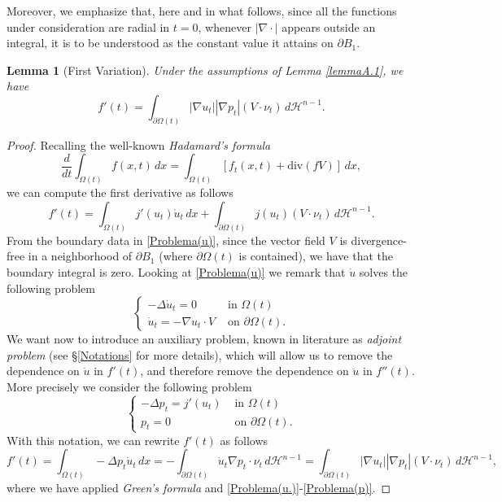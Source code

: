 \documentclass[oneside,a4paper,11pt,notitlepage]{article}
\newcommand{\abs}[1]{{\left|#1\right|}}
\theoremstyle{definition}
\theoremstyle{plain}
\newtheorem{lemma}[theorem]{Lemma}
\theoremstyle{definition}
\begin{document}
Moreover, we emphasize that, here and in what follows, since all the functions under consideration are radial in $t=0$, whenever $\abs{\nabla\cdot}$ appears outside an integral, it is to be understood as the constant value it attains on $\partial B_1$.
\begin{lemma}[First Variation]
    Under the assumptions of Lemma \ref{lemmaA.1}, we have
    \begin{equation*}
        f'(t)=\int_{\partial\Omega(t)}\abs{\nabla u_t}\abs{\nabla p_t}(V\cdot\nu_t)\,d\mathcal{H}^{n-1}.
    \end{equation*}
\end{lemma}
\begin{proof}
    Recalling the well-known \emph{Hadamard's formula}
\begin{equation*}
    \frac{d}{dt}\int_{\Omega(t)}f(x,t)\,dx=\int_{\Omega(t)} [f_t(x,t)+\mathrm{div}(fV)]\,dx,
\end{equation*}
we can compute the first derivative as follows
\begin{equation*}
    f'(t)=\int_{\Omega(t)}j'(u_t)\dot{u}_t\,dx+\int_{\partial\Omega(t)}j(u_t)(V\cdot \nu_t)\,d\mathcal{H}^{n-1}.
\end{equation*}
From the boundary data in \eqref{Problema(u)}, since the vector field $V$ is divergence-free in a neighborhood of $\partial B_1$ (where $\partial\Omega(t)$ is contained), we have that the boundary integral is zero. Looking at \eqref{Problema(u)} we remark that $\dot{u}$ solves the following problem
\begin{equation}\label{Problema(u.)}
    \begin{cases}
        -\Delta \dot{u}_t=0 & \text{ in }\Omega(t)\\
        \dot{u}_t=-\nabla u_t\cdot V & \text{ on } \partial\Omega(t).
    \end{cases}
\end{equation}
We want now to introduce an auxiliary problem, known in literature as \emph{adjoint problem} (see \S\ref{Notations} for more details), which will allow us to remove the dependence on $\dot{u}$ in $f'(t)$, and therefore remove the dependence on $\ddot{u}$ in $f''(t)$. More precisely we consider the following problem
\begin{equation}\label{Problema(p)}
    \begin{cases}
        -\Delta p_t= j'(u_t) & \text{ in }\Omega(t)\\
        p_t=0 & \text{ on } \partial\Omega(t).
    \end{cases}
\end{equation}
With this notation, we can rewrite $f'(t)$ as follows
\begin{equation*}
    f'(t)=\int_{\Omega(t)}-\Delta p_t \dot{u}_t\,dx=-\int_{\partial \Omega(t)}\dot{u}_t\nabla p_t\cdot\nu_t\,d\mathcal{H}^{n-1}=\int_{\partial\Omega(t)}\abs{\nabla u_t}\abs{\nabla p_t}(V\cdot\nu_t)\,d\mathcal{H}^{n-1},
\end{equation*}
where we have applied \emph{Green's formula} and \eqref{Problema(u.)}-\eqref{Problema(p)}.
\end{proof}
\end{document}
